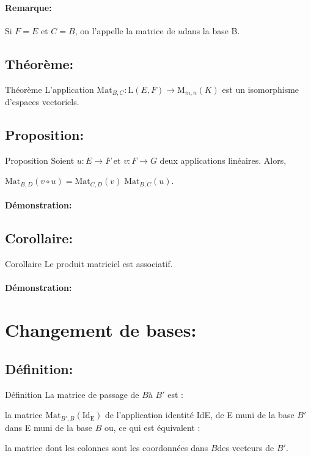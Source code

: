 \documentclass{book}
\begin{document}
\paragraph{Remarque: }
Si ${\displaystyle F=E}$ et ${\displaystyle C=B}$, on l'appelle la matrice de ${\displaystyle u} $dans la base B.
\subsection{Théorème: }
\begin{Théorème}[]{Théorème}{}
L'application ${\displaystyle \mathrm {Mat} _{B,C}:\mathrm {L} (E,F)\to \mathrm {M} _{m,n}(K)}$ est un isomorphisme d'espaces vectoriels.
\end{Théorème}
\subsection{Proposition: }
\begin{Propriété}[]{Proposition}{}
Soient ${\displaystyle u:E\to F}$ et ${\displaystyle v:F\to G}$ deux applications linéaires. Alors,

${\displaystyle \mathrm {Mat} _{B,D}(v\circ u)=\mathrm {Mat} _{C,D}(v)\;\mathrm {Mat} _{B,C}(u)}$.
\end{Propriété}
\paragraph{Démonstration: }
\subsection{Corollaire: }
\begin{Propriété}[]{Corollaire}{}
Le produit matriciel est associatif.
\end{Propriété}
\paragraph{Démonstration:}
\section{Changement de bases: }
\subsection{Définition: }
\begin{Définition}[]{Définition}{}
La matrice de passage de ${\displaystyle B} $à ${\displaystyle B'}$ est :

la matrice ${\displaystyle \mathrm {Mat} _{B',B}(\mathrm {Id_{E}} )}$ de l'application identité IdE, de E muni de la base ${\displaystyle B'}$ dans E muni de la base ${\displaystyle B}$
ou, ce qui est équivalent :

la matrice dont les colonnes sont les coordonnées dans ${\displaystyle B} $des vecteurs de ${\displaystyle B'}$.
\end{Définition}
\end{document}
